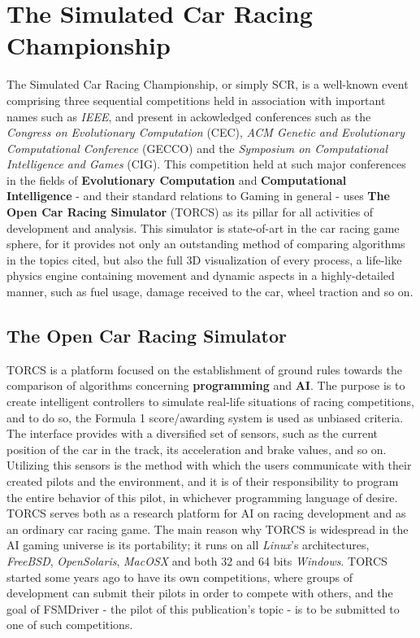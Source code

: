 \section{The Simulated Car Racing Championship}
	
	The Simulated Car Racing Championship, or simply SCR, \cite{scr2009} is a well-known event comprising three sequential
	competitions held in association with important names such as \textit{IEEE}, and present in ackowledged conferences
	such as the \textit{Congress on Evolutionary Computation} (CEC), \textit{ACM Genetic and Evolutionary Computational
	Conference} (GECCO) and the \textit{Symposium on Computational Intelligence and Games} (CIG). This competition held at
	such major conferences in the fields of \textbf{Evolutionary Computation} and \textbf{Computational Intelligence} - and
	their standard relations to Gaming in general - uses \textbf{The Open Car Racing Simulator} (TORCS) as its pillar for
	all activities of development and analysis. This simulator is state-of-art in the car racing game sphere, for it provides
	not only an outstanding method of comparing algorithms in the topics cited, but also the full 3D visualization of every
	process, a life-like physics engine containing movement and dynamic aspects in a highly-detailed manner, such as fuel
	usage, damage received to the car, wheel traction and so on.
	
	\subsection{The Open Car Racing Simulator}
	
	TORCS is a platform focused on the establishment of ground rules towards the comparison of algorithms concerning
	\textbf{programming} and \textbf{AI}. The purpose is to create intelligent controllers to simulate real-life situations
	of racing competitions, and to do so, the Formula 1 score/awarding system is used as unbiased criteria.\\
	The interface provides with a diversified set of sensors, such as the current position of the car in the track, its
	acceleration and brake values, and so on. Utilizing this sensors is the method with which the users communicate with
	their created pilots and the environment, and it is of their responsibility to program the entire behavior of this pilot,
	in whichever programming language of desire.\\
	TORCS serves both as a research platform for AI on racing development and as an ordinary car racing game. The main reason
	why TORCS is widespread in the AI gaming universe is its portability; it runs on all \textit{Linux}'s architectures,
	\textit{FreeBSD}, \textit{OpenSolaris}, \textit{MacOSX} and both 32 and 64 bits \textit{Windows}. TORCS started some years
	ago to have its own competitions, where groups of development can submit their pilots in order to compete with others,
	and the goal of FSMDriver - the pilot of this publication's topic - is to be submitted to one of such competitions.
	
